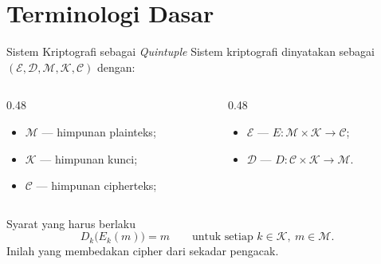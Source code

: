 \documentclass[aspectratio=169,11pt]{beamer}
\begin{document}
\section{Terminologi Dasar}

\begin{frame}{Sistem Kriptografi sebagai \textit{Quintuple}}
    Sistem kriptografi dinyatakan sebagai
    $(\mathcal{E}, \mathcal{D}, \mathcal{M}, \mathcal{K}, \mathcal{C})$ dengan:
    \vspace{0.15cm}
    \begin{columns}[T,onlytextwidth]
        \begin{column}{0.48\textwidth}
            \begin{itemize}
                \item $\mathcal{M}$ --- himpunan plainteks;
                \item $\mathcal{K}$ --- himpunan kunci;
                \item $\mathcal{C}$ --- himpunan cipherteks;
            \end{itemize}
        \end{column}
        \begin{column}{0.48\textwidth}
            \begin{itemize}
                \item $\mathcal{E}$ --- $E: \mathcal{M} \times \mathcal{K} \to \mathcal{C}$;
                \item $\mathcal{D}$ --- $D: \mathcal{C} \times \mathcal{K} \to \mathcal{M}$.
            \end{itemize}
        \end{column}
    \end{columns}
    \vspace{0.3cm}
    \begin{alertblock}{Syarat yang harus berlaku}
        \[
            D_k\bigl(E_k(m)\bigr) = m
            \qquad \text{untuk setiap } k \in \mathcal{K},\ m \in \mathcal{M}.
        \]
        Inilah yang membedakan cipher dari sekadar pengacak.
    \end{alertblock}
\end{frame}
\end{document}
